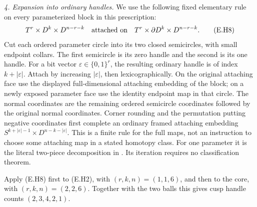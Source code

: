 \emph{4. Expansion into ordinary handles.}
We use the following fixed elementary rule on every parameterized
block in this prescription:
\[
 T^r\times D^k\times D^{n-r-k}
 \quad\hbox{attached on}\quad
 T^r\times\partial D^k\times D^{n-r-k}.
 \tag{E.H8}
\]
Cut each ordered parameter circle into its two closed semicircles,
with small endpoint collars.  The first semicircle is its zero
handle and the second is its one handle.  For a bit vector
$\varepsilon\in\{0,1\}^r$, the resulting ordinary handle is of
index $k+|\varepsilon|$.  Attach by increasing $|\varepsilon|$,
then lexicographically.  On the original attaching face use
the displayed full-dimensional attaching embedding of the block;
on a newly exposed parameter face use the identity endpoint map
in that circle.  The normal coordinates are the remaining ordered
semicircle coordinates followed by the original normal coordinates.
Corner rounding and the permutation putting negative coordinates
first complete an ordinary framed attaching embedding
$S^{k+|\varepsilon|-1}\times D^{n-k-|\varepsilon|}$.
This is a finite rule for the full maps, not an instruction to choose
some attaching map in a stated homotopy class.  For one parameter
it is the literal two-piece decomposition in
\cite[Section~4.1, equation~(16), p.~103]{mapsVogel09}.
Its iteration requires no classification theorem.

Apply (E.H8) first to (E.H2), with $(r,k,n)=(1,1,6)$, and then
to the core, with $(r,k,n)=(2,2,6)$.  Together with the two balls
this gives cusp handle counts $(2,3,4,2,1)$.

